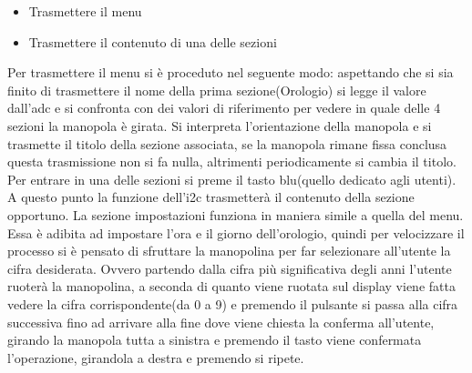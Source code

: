 \documentclass[main.tex]{subfiles}
\begin{document}
\begin{itemize}
    \item Trasmettere il menu
    \item Trasmettere il contenuto di una delle sezioni
\end{itemize}
Per trasmettere il menu si è proceduto nel seguente modo: aspettando che si sia finito di trasmettere il nome della prima sezione(Orologio) si legge il valore dall'adc e si confronta con dei valori di riferimento per vedere in quale delle 4 sezioni la manopola è girata. Si interpreta l'orientazione della manopola e si trasmette il titolo della sezione associata, se la manopola rimane fissa conclusa questa trasmissione non si fa nulla, altrimenti periodicamente si cambia il titolo. Per entrare in una delle sezioni si preme il tasto blu(quello dedicato agli utenti). A questo punto la funzione dell'i2c trasmetterà il contenuto della sezione opportuno. 
La sezione impostazioni funziona in maniera simile a quella del menu. Essa è adibita ad impostare l'ora e il giorno dell'orologio, quindi per velocizzare il processo si è pensato di sfruttare la manopolina per far selezionare all'utente la cifra desiderata. Ovvero partendo dalla cifra più significativa degli anni l'utente ruoterà la manopolina, a seconda di quanto viene ruotata sul display viene fatta vedere la cifra corrispondente(da 0 a 9) e premendo il pulsante si passa alla cifra successiva fino ad arrivare alla fine dove viene chiesta la conferma all'utente, girando la manopola tutta a sinistra e premendo il tasto viene confermata l'operazione, girandola a destra e premendo si ripete.
\end{document}
